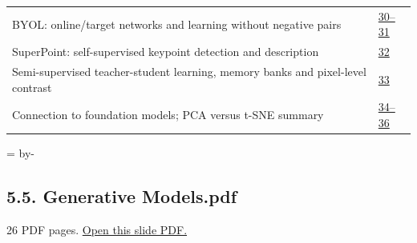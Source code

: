 \documentclass[10pt]{article}
\newcommand{\deckheading}[1]{\par\begingroup\skip0=\pagegoal\advance\skip0 by-\pagetotal\ifdim\skip0<7\baselineskip\newpage\fi\endgroup\subsection{#1}}
\begin{document}
\begin{longtable}{@{}P{.79\linewidth}P{.17\linewidth}@{}}
BYOL: online/target networks and learning without negative pairs & \href{../Lecture\%20Slides/5.4.\%20Unsupervised\%20learning.pdf\#page=30}{30--31}\\[3pt]
SuperPoint: self-supervised keypoint detection and description & \href{../Lecture\%20Slides/5.4.\%20Unsupervised\%20learning.pdf\#page=32}{32}\\[3pt]
Semi-supervised teacher-student learning, memory banks and pixel-level contrast & \href{../Lecture\%20Slides/5.4.\%20Unsupervised\%20learning.pdf\#page=33}{33}\\[3pt]
Connection to foundation models; PCA versus t-SNE summary & \href{../Lecture\%20Slides/5.4.\%20Unsupervised\%20learning.pdf\#page=34}{34--36}\\[3pt]
\bottomrule\end{longtable}
\deckheading{5.5. Generative Models.pdf}
{\small 26 PDF pages. \href{../Lecture\%20Slides/5.5.\%20Generative\%20Models.pdf}{Open this slide PDF.}}\par
\end{document}
